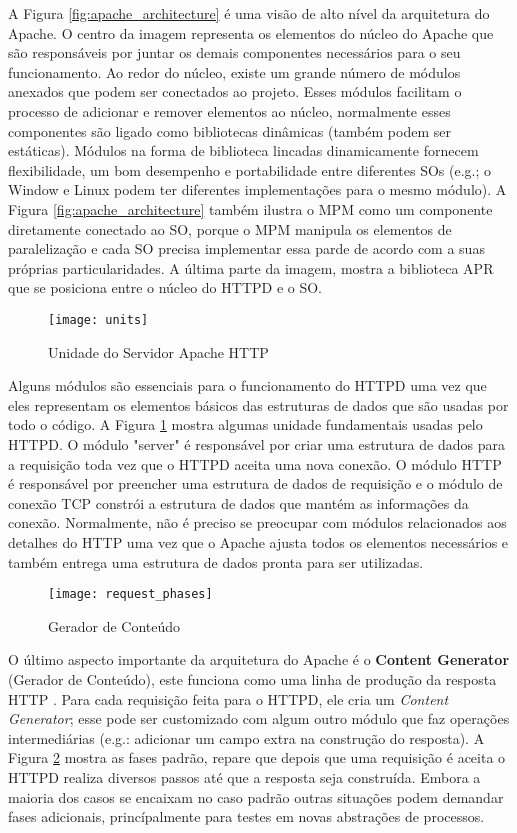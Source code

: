 A Figura \ref{fig:apache_architecture} é uma visão de alto nível da arquitetura
do Apache. O centro da imagem representa os elementos do núcleo do Apache que
são responsáveis por juntar os demais componentes necessários para o seu
funcionamento. Ao redor do núcleo, existe um grande número de módulos anexados
que podem ser conectados ao projeto. Esses módulos facilitam o processo de
adicionar e remover elementos ao núcleo, normalmente esses componentes são
ligado como bibliotecas dinâmicas (também podem ser estáticas). Módulos na
forma de biblioteca lincadas dinamicamente fornecem flexibilidade, um bom
desempenho e portabilidade entre diferentes SOs (e.g.; o Window e Linux podem
ter diferentes implementações para o mesmo módulo). A Figura
\ref{fig:apache_architecture} também ilustra o MPM como um componente
diretamente conectado ao SO, porque o MPM manipula os elementos de
paralelização e cada SO precisa implementar essa parde de acordo com a suas
próprias particularidades. A última parte da imagem, mostra a biblioteca APR
que se posiciona entre o núcleo do HTTPD e o SO.

\begin{figure}[!h]
  \centering
  \texttt{[image: units]} 
  \caption{Unidade do Servidor Apache HTTP}
  \label{fig:units} 
\end{figure}

Alguns módulos são essenciais para o funcionamento do HTTPD uma vez que eles
representam os elementos básicos das estruturas de dados que são usadas por
todo o código. A Figura \ref{fig:units} mostra algumas unidade fundamentais
usadas pelo HTTPD. O módulo "server" é responsável por criar uma estrutura de
dados para a requisição toda vez que o HTTPD aceita uma nova conexão. O módulo
HTTP é responsável por preencher uma estrutura de dados de requisição e o
módulo de conexão TCP constrói a estrutura de dados que mantém as informações
da conexão. Normalmente, não é preciso se preocupar com módulos relacionados
aos detalhes do HTTP uma vez que o Apache ajusta todos os elementos necessários
e também entrega uma estrutura de dados pronta para ser utilizadas.

\begin{figure}[!h]
  \centering
  \texttt{[image: request\_phases]} 
  \caption{Gerador de Conteúdo \citep{apache_module_book}}
  \label{fig:content_generator} 
\end{figure}

O último aspecto importante da arquitetura do Apache é o \textbf{Content
Generator} (Gerador de Conteúdo), este funciona como uma linha de produção da
resposta HTTP \citep{apache_module_book}. Para cada requisição feita para o
HTTPD, ele cria um \textit{Content Generator}; esse pode ser customizado com
algum outro módulo que faz operações intermediárias (e.g.: adicionar um campo
extra na construção do resposta). A Figura \ref{fig:content_generator} mostra
as fases padrão, repare que depois que uma requisição é aceita o HTTPD realiza
diversos passos até que a resposta seja construída. Embora a maioria dos casos
se encaixam no caso padrão outras situações podem demandar fases adicionais,
princípalmente para testes em novas abstrações de processos.

